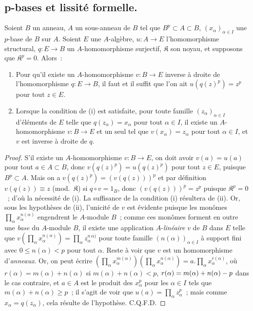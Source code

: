 \subsection{p-bases et lissité formelle.}
\label{0.21.2-fr}

\begin{theorem}[21.2.1]
\label{0.21.2.1-fr}
Soient $B$ un anneau, $A$ un sous-anneau de $B$ tel que $B^p\subset A\subset B$,
$(x_\alpha)_{\alpha\in I}$ une $p$-base de $B$ sur $A$.
Soient $E$ une $A$-algèbre, $u:A\to E$ l'homomorphisme structural,
$q:E\to B$ un $A$-homomorphisme surjectif, $\mathfrak K$ son noyau, et
supposons que $\mathfrak K^p=0$. Alors~:
\begin{enumerate}
  \item[\textup{(i)}] Pour qu'il existe un $A$-homomorphisme $v:B\to E$ inverse à
  droite de l'homomorphisme $q:E\to B$, il faut et il suffit que l'on ait
  $u(q(z)^p)=z^p$ pour tout $z\in E$.
  \item[\textup{(ii)}] Lorsque la condition de \textup{(i)} est satisfaite, pour toute famille
  $(z_\alpha)_{\alpha\in I}$ d'éléments de $E$ telle que
  $q(z_\alpha)=x_\alpha$ pour tout $\alpha\in I$, il existe un
  $A$-homomorphisme $v:B\to E$ et un seul tel que $v(x_\alpha)=z_\alpha$
  pour tout $\alpha\in I$, et $v$ est inverse à droite de $q$.
\end{enumerate}
\end{theorem}

\begin{proof}
S'il existe un $A$-homomorphisme $v:B\to E$, on doit avoir $v(a)=u(a)$ pour
tout $a\in A\subset B$, donc $v(q(z)^p)=u(q(z)^p)$ pour tout $z\in E$,
puisque $B^p\subset A$. Mais on a $v(q(z)^p)=(v(q(z)))^p$ et par définition
$v(q(z))\equiv z$ (mod.~$\mathfrak K$) si $q\circ v=1_B$, donc
$(v(q(z)))^p=z^p$ puisque $\mathfrak K^p=0$~; d'où la nécessité de (i).
La suffisance de la condition (i) résultera de (ii).
Or, sous les hypothèses de (ii), l'unicité de $v$ est évidente puisque les
monômes $\prod_\alpha x_\alpha^{n(\alpha)}$ engendrent le $A$-module $B$~;
comme ces monômes forment en outre une \emph{base} du $A$-module $B$, il existe
une application $A$-\emph{linéaire} $v$ de $B$ dans $E$ telle que
$v(\prod_\alpha x_\alpha^{n(\alpha)})=\prod_\alpha z_\alpha^{n\,\alpha)}$
pour toute famille $(n(\alpha))_{\alpha\in I}$ à support fini avec
$0\leq n(\alpha)<p$ pour tout $\alpha$. Reste à voir que $v$ est un
homomorphisme d'\emph{anneaux}. Or, on peut écrire
$(\prod_\alpha x_\alpha^{m(\alpha)})(\prod_\alpha x_\alpha^{n(\alpha)})
=a.\prod_\alpha x_\alpha^{r(\alpha)}$, où
$r(\alpha)=m(\alpha)+n(\alpha)$ si $m(\alpha)+n(\alpha)<p$,
$r(\alpha)=m(\alpha)+n(\alpha)- p$ dans le cas contraire, et $a\in A$
est le produit des $x_\alpha^p$ pour les $\alpha\in I$ tels que
$m(\alpha)+n(\alpha)\geq p$~; il s'agit de voir que
$u(a)=\prod_\alpha z_\alpha^p$~; mais comme $x_\alpha=q(z_\alpha)$, cela
résulte de l'hypothèse. C.Q.F.D.
\end{proof}

